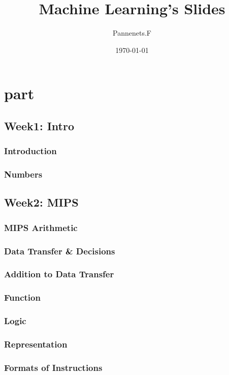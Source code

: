 \documentclass[en,11pt,english,black,simple,device=ppt]{elegantbook}
\title{Machine Learning's Slides}
\author{Pannenets.F}
\date{\today}
\begin{document}
\maketitle
\frontmatter

\mainmatter

\part{part}

\chapter{Week1: Intro}

\section{Introduction}



\section{Numbers}



\chapter{Week2: MIPS}

\section{MIPS Arithmetic}



\section{Data Transfer \& Decisions}



\section{Addition to Data Transfer}



\section{Function}



\section{Logic}



\section{Representation}



\section{Formats of Instructions}


\end{document}
